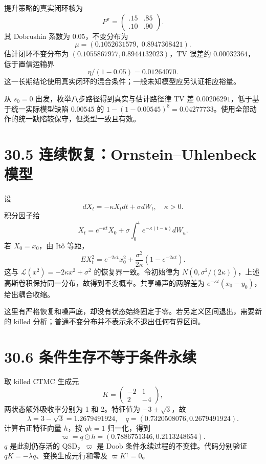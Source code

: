 \documentclass[
  11pt,
  oneside]{book}
\begin{document}
提升策略的真实闭环核为 \[P^\pi=\begin{pmatrix}.15&.85\\.10&.90\end{pmatrix}.\] 其 Dobrushin 系数为 \(0.05\)，不变分布为 \[\mu=(0.1052631579,\;0.8947368421).\] 估计闭环不变分布为 \((0.1055867977,0.8944132023)\)，TV 误差约 \(0.00032364\)，低于置信运输界 \[\eta/(1-0.05)=0.01264070.\] 这一长期结论使用真实闭环的混合条件；一般未知模型应另认证相应裕量。

从 \(s_0=0\) 出发，枚举八步路径得到真实与估计路径律 TV 差 \(0.00206291\)，低于基于统一实际模型缺陷 \(0.00545\) 的 \(1-(1-0.00545)^8=0.04277733\)。使用全部动作的统一缺陷较保守，但类型一致且有效。

\section{30.5 连续恢复：Ornstein--Uhlenbeck 模型}\label{ux8fdeux7eedux6062ux590dornsteinuhlenbeck-ux6a21ux578b}

设 \[dX_t=-\kappa X_tdt+\sigma dW_t,\quad\kappa>0.\] 积分因子给 \[X_t=e^{-\kappa t}X_0+
\sigma\int_0^te^{-\kappa(t-u)}dW_u.\] 若 \(X_0=x_0\)，由 Itô 等距， \[EX_t^2=e^{-2\kappa t}x_0^2+
\frac{\sigma^2}{2\kappa}(1-e^{-2\kappa t}).\] 这与 \(\mathcal L(x^2)=-2\kappa x^2+\sigma^2\) 的恢复界一致。令初始律为 \(N(0,\sigma^2/(2\kappa))\)，上述高斯卷积保持同一分布，故得到不变概率。共享噪声的两解差为 \(e^{-\kappa t}(x_0-y_0)\)，给出耦合收缩。

这里有严格恢复和噪声底，却没有状态始终固定于零。若另定义区间退出，需要新的 killed 分析；普通不变分布并不表示永不退出任何有界区间。

\section{30.6 条件生存不等于条件永续}\label{ux6761ux4ef6ux751fux5b58ux4e0dux7b49ux4e8eux6761ux4ef6ux6c38ux7eed}

取 killed CTMC 生成元 \[K=\begin{pmatrix}-2&1\\2&-4\end{pmatrix},\] 两状态额外吸收率分别为 1 和 2。特征值为 \(-3\pm\sqrt3\)，故 \[\lambda=3-\sqrt3=1.2679491924,
\quad q=(0.7320508076,0.2679491924).\] 计算右正特征向量 \(h\)，按 \(qh=1\) 归一化，得到 \[\varpi=q\odot h=(0.7886751346,0.2113248654).\] \(q\) 是此刻仍存活的 QSD，\(\varpi\) 是 Doob 条件永续过程的不变律。代码分别验证 \(qK=-\lambda q\)、变换生成元行和零及 \(\varpi K^\uparrow=0\)。
\end{document}
